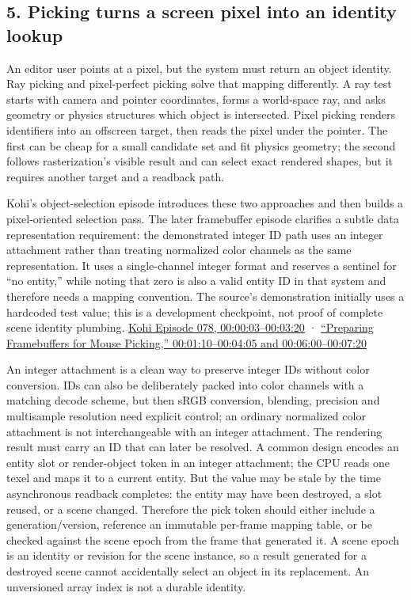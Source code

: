 \subsection{5. Picking turns a screen pixel into an identity lookup}\label{06-engine-ii-ch041-picking-turns-a-screen-pixel-into-an-identity-lookup}

\hypertarget{06-engine-ii-ch041-picking-turns-a-screen-pixel-into-an-identity-lookup}{}

An editor user points at a pixel, but the system must return an object identity. Ray picking and pixel-perfect picking solve that mapping differently. A ray test starts with camera and pointer coordinates, forms a world-space ray, and asks geometry or physics structures which object is intersected. Pixel picking renders identifiers into an offscreen target, then reads the pixel under the pointer. The first can be cheap for a small candidate set and fit physics geometry; the second follows rasterization's visible result and can select exact rendered shapes, but it requires another target and a readback path.

Kohi's object-selection episode introduces these two approaches and then builds a pixel-oriented selection pass. The later framebuffer episode clarifies a subtle data representation requirement: the demonstrated integer ID path uses an integer attachment rather than treating normalized color channels as the same representation. It uses a single-channel integer format and reserves a sentinel for ``no entity,'' while noting that zero is also a valid entity ID in that system and therefore needs a mapping convention. The source's demonstration initially uses a hardcoded test value; this is a development checkpoint, not proof of complete scene identity plumbing. \href{https://www.youtube.com/watch?v=mx1TyxNFrdo&t=3s}{Kohi Episode 078, 00:00:03--00:03:20} · \href{https://www.youtube.com/watch?v=wYVaIOUhz6s&t=1m10s}{``Preparing Framebuffers for Mouse Picking,'' 00:01:10--00:04:05 and 00:06:00--00:07:20}

An integer attachment is a clean way to preserve integer IDs without color conversion. IDs can also be deliberately packed into color channels with a matching decode scheme, but then sRGB conversion, blending, precision and multisample resolution need explicit control; an ordinary normalized color attachment is not interchangeable with an integer attachment. The rendering result must carry an ID that can later be resolved. A common design encodes an entity slot or render-object token in an integer attachment; the CPU reads one texel and maps it to a current entity. But the value may be stale by the time asynchronous readback completes: the entity may have been destroyed, a slot reused, or a scene changed. Therefore the pick token should either include a generation/version, reference an immutable per-frame mapping table, or be checked against the scene epoch from the frame that generated it. A scene epoch is an identity or revision for the scene instance, so a result generated for a destroyed scene cannot accidentally select an object in its replacement. An unversioned array index is not a durable identity.

